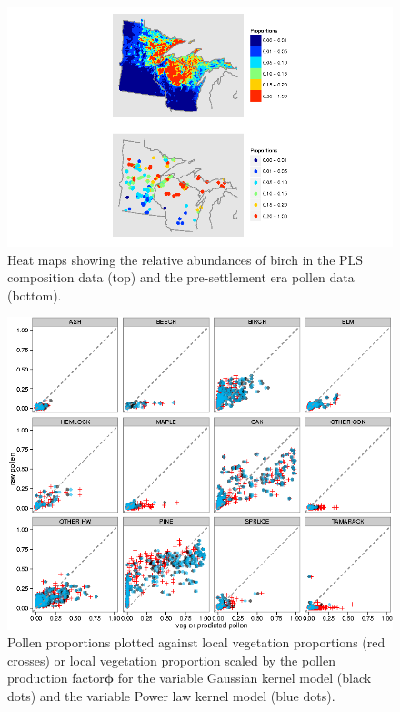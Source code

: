 \begin{figure}
\centering
\includegraphics[width=7in]{figures/maps_compare_BIRCH.png}
\caption{Heat maps showing the relative abundances of birch in the PLS
  composition data (top) and the pre-settlement era pollen data
  (bottom).}
\label{fig:compare_maps_BIRCH}
\end{figure}

\begin{figure}
\centering
\includegraphics[width=7in]{figures/pollen_phi_scaled_flexible.png}
\caption{Pollen proportions plotted against local vegetation
  proportions (red crosses) or local vegetation proportion scaled by
  the pollen production factor$\bm{\phi}$ for the variable Gaussian
  kernel model (black dots) and the variable Power law kernel model
  (blue dots).}
\label{fig:focal_scaled}
\end{figure}

